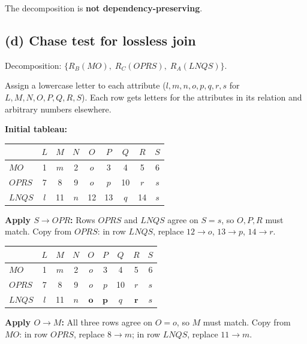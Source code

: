 \documentclass[11pt]{article}
\begin{document}
The decomposition is \textbf{not dependency-preserving}.

\subsection*{(d) Chase test for lossless join}

Decomposition: $\{R_B(MO),\; R_C(OPRS),\; R_A(LNQS)\}$.

Assign a lowercase letter to each attribute
($l, m, n, o, p, q, r, s$ for $L, M, N, O, P, Q, R, S$).
Each row gets letters for the attributes in its relation and
arbitrary numbers elsewhere.

\medskip
\textbf{Initial tableau:}

\begin{center}
\begin{tabular}{|l|c c c c c c c c|}
\hline
       & $L$ & $M$ & $N$ & $O$ & $P$ & $Q$ & $R$ & $S$ \\
\hline
$MO$   & 1   & $m$ & 2   & $o$ & 3   & 4   & 5   & 6   \\
$OPRS$ & 7   & 8   & 9   & $o$ & $p$ & 10  & $r$ & $s$ \\
$LNQS$ & $l$ & 11  & $n$ & 12  & 13  & $q$ & 14  & $s$ \\
\hline
\end{tabular}
\end{center}

\textbf{Apply $S \to OPR$:}
Rows $OPRS$ and $LNQS$ agree on $S = s$, so $O, P, R$ must match.
Copy from $OPRS$: in row $LNQS$, replace $12 \to o$,
$13 \to p$, $14 \to r$.

\begin{center}
\begin{tabular}{|l|c c c c c c c c|}
\hline
       & $L$ & $M$ & $N$ & $O$          & $P$          & $Q$
       & $R$          & $S$ \\
\hline
$MO$   & 1   & $m$ & 2   & $o$          & 3            & 4
       & 5            & 6   \\
$OPRS$ & 7   & 8   & 9   & $o$          & $p$          & 10
       & $r$          & $s$ \\
$LNQS$ & $l$ & 11  & $n$ & $\mathbf{o}$ & $\mathbf{p}$ & $q$
       & $\mathbf{r}$ & $s$ \\
\hline
\end{tabular}
\end{center}

\textbf{Apply $O \to M$:}
All three rows agree on $O = o$, so $M$ must match.
Copy from $MO$: in row $OPRS$, replace $8 \to m$;
in row $LNQS$, replace $11 \to m$.
\end{document}
